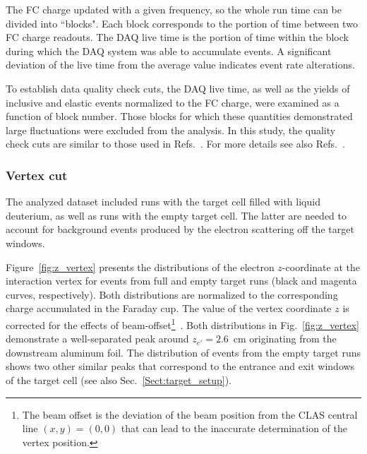 \documentclass[prc,twocolumn,superscriptaddress,showpacs,amssymb,amsmath,amsfonts,aps,nofootinbib]{revtex4-1}
\begin{document}
The FC charge updated with a given frequency, so the whole run time can be divided into ``blocks". Each block corresponds to the portion of time between two FC charge readouts. The DAQ live time is the portion of time within the block during which the DAQ system was able to accumulate events. A significant deviation of the live time from the average value indicates event rate alterations.


To establish data quality check cuts, the DAQ live time, as well as the yields of inclusive and elastic events normalized to the FC charge, were examined as a function of block number. Those blocks for which these quantities demonstrated large fluctuations were excluded from the analysis. In this study, the quality check cuts are similar to those used in Refs.\!~\cite{Fed_an_note:2017,Fed_paper_2018}. For more details see also Refs.\!~\cite{my_an_note:2020, my_thesis:2021}. 




\subsubsection{Vertex cut}
\label{Sect:vertex}

The analyzed dataset included runs with the target cell filled with liquid deuterium, as well as runs with the empty target cell. The latter are needed to account for background events produced by the electron scattering off the target windows. 

Figure~\ref{fig:z_vertex} presents the distributions of the electron $z$-coordinate at the interaction vertex for events from full and empty target runs (black and magenta curves, respectively). Both distributions are normalized to the corresponding charge accumulated in the Faraday cup. The value of the vertex coordinate $z$ is corrected for the effects of beam-offset\footnote[2]{The beam offset is the deviation of the beam position from the CLAS central line $(x,y)=(0,0)$ that can lead to the inaccurate determination of the vertex position.}~\cite{my_an_note:2020, my_thesis:2021}. Both distributions in Fig.\!~\ref{fig:z_vertex} demonstrate a well-separated peak around $z_{e'} = 2.6$~cm originating from the downstream aluminum foil. The distribution of events from the empty target runs shows two other similar peaks that correspond to the entrance and exit windows of the target cell (see also Sec.\!~\ref{Sect:target_setup}). 
\end{document}
